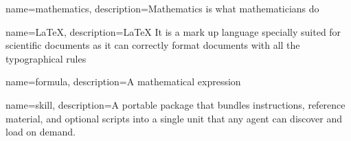 {
    name=mathematics,
    description={Mathematics is what mathematicians do}
}

{
    name=LaTeX,
    description={LaTeX It is a mark up language specially suited for scientific documents as it can correctly format documents with all the typographical rules}
}


{
    name=formula,
    description={A mathematical expression}
}

{
    name=skill,
    description={A portable package that bundles instructions, reference material, and optional scripts into a single unit that any agent can discover and load on demand.} 
}
